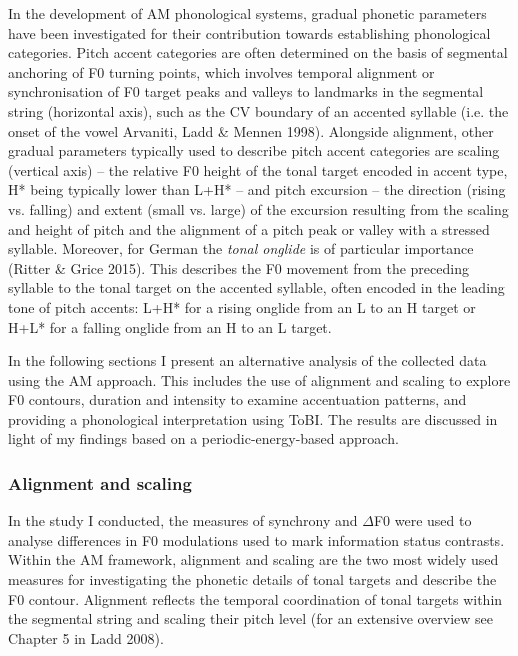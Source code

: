 \begin{styleStandard}
In the development of AM phonological systems, gradual phonetic parameters have been investigated for their contribution towards establishing phonological categories. Pitch accent categories are often determined on the basis of segmental anchoring of F0 turning points, which involves temporal alignment or synchronisation of F0 target peaks and valleys to landmarks in the segmental string (horizontal axis), such as the \textsc{CV} boundary of an accented syllable (i.e. the onset of the vowel Arvaniti, Ladd \& Mennen 1998). Alongside alignment, other gradual parameters typically used to describe pitch accent categories are scaling (vertical axis) – the relative F0 height of the tonal target encoded in accent type, H* being typically lower than L+H* – and pitch excursion – the direction (rising vs. falling) and extent (small vs. large) of the excursion resulting from the scaling and height of pitch and the alignment of a pitch peak or valley with a stressed syllable. Moreover, for German the \textit{tonal onglide} is of particular importance (Ritter \& Grice 2015). This describes the F0 movement from the preceding syllable to the tonal target on the accented syllable, often encoded in the leading tone of pitch accents: L+H* for a rising onglide from an L to an H target or H+L* for a falling onglide from an H to an L target.
\end{styleStandard}

\begin{styleStandard}
In the following sections I present an alternative analysis of the collected data using the AM approach. This includes the use of alignment and scaling to explore F0 contours, duration and intensity to examine accentuation patterns, and providing a phonological interpretation using ToBI. The results are discussed in light of my findings based on a periodic-energy-based approach.
\end{styleStandard}

\subsubsection[Alignment and scaling]{Alignment and scaling}
\hypertarget{Toc191305918}{}\begin{styleStandard}
In the study I conducted, the measures of synchrony and ${\Delta}$F0 were used to analyse differences in F0 modulations used to mark information status contrasts. Within the AM framework, alignment and scaling are the two most widely used measures for investigating the phonetic details of tonal targets and describe the F0 contour. Alignment reflects the temporal coordination of tonal targets within the segmental string and scaling their pitch level (for an extensive overview see Chapter 5 in Ladd 2008). 
\end{styleStandard}

